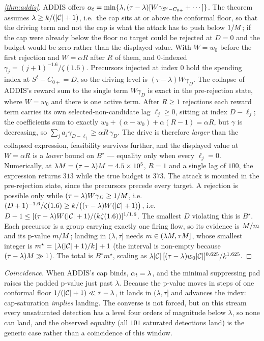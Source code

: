 \begin{proof}[\cref{thm:addis}]
ADDIS offers $\alpha_t=\min\{\lambda,(\tau-\lambda)[W\gamma_{S^t-C_{0+}}+\cdots]\}$. The theorem
assumes $\lambda\ge k/(\lvert\mathcal{C}\rvert+1)$, i.e.\ the cap sits at or above the conformal floor, so that the
driving term and not the cap is what the attack has to push below $1/M$; if the cap were already
below the floor no target could be rejected at $D=0$ and the budget would be zero rather than the
displayed value. With $W=w_0$
before the first rejection and $W=\alpha R$ after $R$ of them, and $0$-indexed
$\gamma_j=(j+1)^{-1.6}/\zeta(1.6)$. Precursors injected at index $0$ hold the spending index at
$S^t-C_{0+}=D$, so the driving level is $(\tau-\lambda)W\gamma_D$. The collapse of ADDIS's reward sum to
the single term $W\gamma_D$ is exact in the pre-rejection state, where $W=w_0$ and there is one active
term. After $R\ge1$ rejections each reward term carries its own selected-non-candidate lag
$\ell_j\ge0$, sitting at index $D-\ell_j$; the coefficients sum to exactly
$w_0+(\alpha-w_0)+\alpha(R-1)=\alpha R$, but $\gamma$ is decreasing, so
$\sum_j a_j\gamma_{D-\ell_j}\ge\alpha R\,\gamma_D$. The drive is therefore \emph{larger} than the
collapsed expression, feasibility survives further, and the displayed value at $W=\alpha R$ is a
\emph{lower} bound on $B^\star$ --- equality only when every $\ell_j=0$. Numerically, at
$\lambda M=(\tau-\lambda)M=4.5\times10^{5}$, $R=1$ and a single lag of $100$, the expression
returns $313$ while the true budget is $373$. The attack is mounted in the pre-rejection state, since the precursors precede every target. A rejection is possible only
while $(\tau-\lambda)W\gamma_D\ge1/M$, i.e.
$(D+1)^{-1.6}/\zeta(1.6)\ge k/\big((\tau-\lambda)W(\lvert\mathcal{C}\rvert+1)\big)$, i.e.
$D+1\le[(\tau-\lambda)W(\lvert\mathcal{C}\rvert+1)/(k\zeta(1.6))]^{1/1.6}$. The smallest $D$ violating this is
$B^\star$. Each precursor is a group carrying exactly one firing flow, so its evidence is $M/m$
and its p-value $m/M$; landing in $(\lambda,\tau]$ needs $m\in(\lambda M,\tau M]$, whose
smallest integer is $m^\star=\lfloor\lambda(\lvert\mathcal{C}\rvert+1)/k\rfloor+1$ (the interval is non-empty because
$(\tau-\lambda)M\gg1$). The total is $B^\star m^\star$, scaling as
$\lambda\lvert\mathcal{C}\rvert\,[(\tau-\lambda)w_0\lvert\mathcal{C}\rvert]^{0.625}/k^{1.625}$.
\end{proof}

\emph{Coincidence.} When ADDIS's cap binds, $\alpha_t=\lambda$, and the minimal suppressing pad
raises the padded p-value just past $\lambda$. Because the p-value moves in steps of one conformal
floor $1/(\lvert\mathcal{C}\rvert+1)\ll\tau-\lambda$, it lands in $(\lambda,\tau]$ and advances the index:
cap-saturation \emph{implies} landing. The converse is not forced, but on this stream every
unsaturated detection has a level four orders of magnitude below $\lambda$, so none can land, and
the observed equality (all $101$ saturated detections land) is the generic case rather than a
coincidence of this window.


